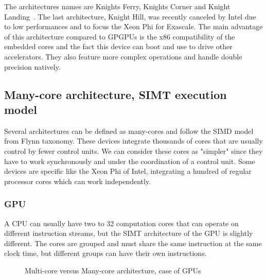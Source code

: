 The architectures names are Knights Ferry, Knights Corner and Knight Landing~\cite{sodani2016knights}. 
The last architecture, Knight Hill, was recently canceled by Intel due to low performances and to focus the Xeon Phi for Exascale.
The main advantage of this architecture compared to GPGPUs is the x86 compatibility of the embedded cores and the fact this device can boot and use to drive other accelerators. 
They also feature more complex operations and handle double precision natively.

\subsection{Many-core architecture, SIMT execution model}
Several architectures can be defined as many-cores and follow the SIMD model from Flynn taxonomy.
These devices integrate thousands of cores that are usually control by fewer control units. 
We can consider these cores as "simpler" since they have to work synchronously and under the coordination of a control unit.
Some devices are specific like the Xeon Phi of Intel, integrating a hundred of regular processor cores which can work independently. 

\subsubsection{GPU}
A CPU can usually have two to 32 computation cores that can operate on different instruction streams, but the SIMT architecture of the GPU is slightly different. 
The cores are grouped and must share the same instruction at the same clock time, but different groups can have their own instructions. 

\begin{figure}
\begin{center}
\hspace{1cm}
\end{center}
\caption{Multi-core versus Many-core architecture, case of GPUs}
\label{fig:2_HARD:gpu}
\end{figure}

